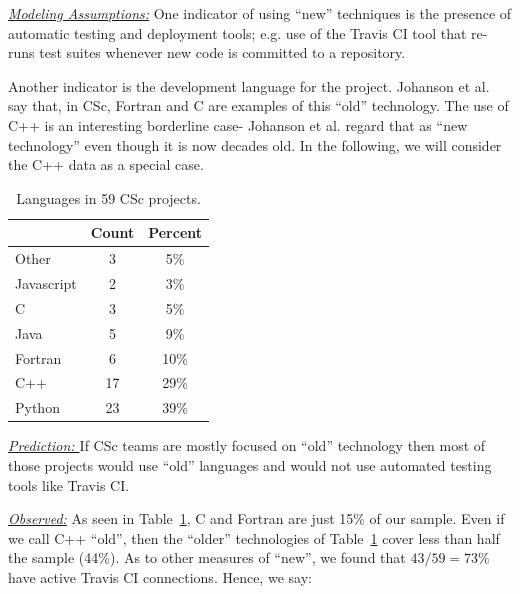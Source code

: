\documentclass[conference,10pt]{IEEEtran}
\begin{document}
\noindent \textit{\underline{Modeling Assumptions:}} 
One indicator of using ``new'' techniques is the presence of automatic testing and deployment tools; e.g. use of the Travis CI tool that re-runs test suites whenever new code is committed to a repository. 

Another indicator is the development language for the project. 
Johanson et al.~\cite{johan18_secs} say that, in CSc, Fortran and C are examples of this ``old'' technology. The use of C++ is an interesting borderline case- Johanson et al. regard that as ``new technology'' even though it is now decades old. In the following, we will consider the C++ data as a special case.




\begin{table}
\vspace{-15pt}
\caption{Languages in 59 CSc projects.  
}\label{tbl:language}
\vspace{-12pt}
 \footnotesize
 \hspace{-3pt}\begin{tabular}{l|c|c}
 \multicolumn{1}{c|}{} & \multicolumn{1}{c|}{Count} & \multicolumn{1}{c}{Percent}\\
\hline
Other & 3 &  5\%  \\ 
Javascript	& 2 & 3\% \\ 
C &	3 & 5\% \\ 
Java	& 5 & 9\% \\ 
Fortran	& 6 & 10\% \\
C++	& 17 & 29\% \\
Python & 23 & 39\% 
\end{tabular}
\vspace{-10pt}
\end{table} \noindent \textit{\underline{Prediction: }} If CSc teams are mostly focused on ``old'' technology then most of those projects would use ``old'' languages and would not use automated testing
tools like  Travis CI.


\noindent\textit{\underline{Observed:}} 
As seen in Table~\ref{tbl:language}, C and Fortran are just 15\% of our sample.
Even if we call C++ ``old'', then the ``older'' technologies of Table~\ref{tbl:language}
cover less than half the sample (44\%).
As to other measures of ``new'', we found that  $43/59=73\%$
have active
Travis CI connections.  Hence, we say:
\end{document}
